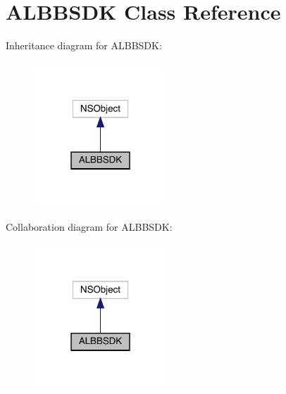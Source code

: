 \hypertarget{interface_a_l_b_b_s_d_k}{}\section{A\+L\+B\+B\+S\+DK Class Reference}
\label{interface_a_l_b_b_s_d_k}


Inheritance diagram for A\+L\+B\+B\+S\+DK\+:\nopagebreak
\begin{figure}[H]
\begin{center}
\leavevmode
\includegraphics[width=142pt]{interface_a_l_b_b_s_d_k__inherit__graph}
\end{center}
\end{figure}


Collaboration diagram for A\+L\+B\+B\+S\+DK\+:\nopagebreak
\begin{figure}[H]
\begin{center}
\leavevmode
\includegraphics[width=142pt]{interface_a_l_b_b_s_d_k__coll__graph}
\end{center}
\end{figure}
